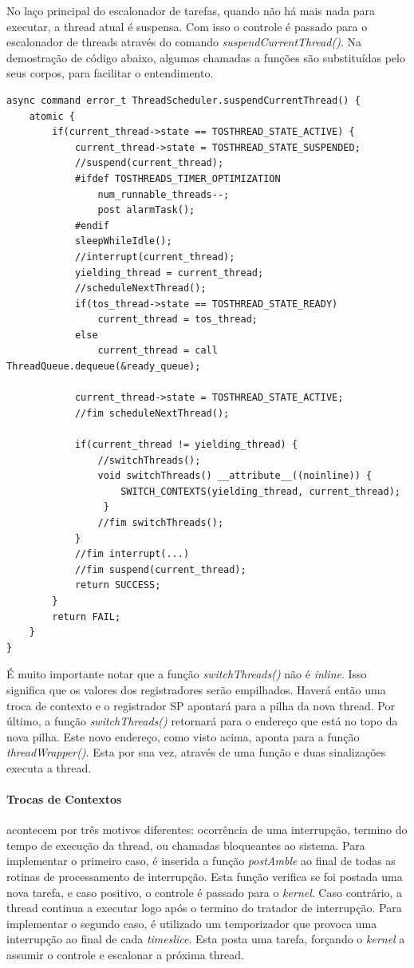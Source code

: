 \documentclass[a4paper, 10pt]{article}
\begin{document}
No laço principal do escalonador de tarefas, quando não há mais nada para executar, a thread atual é suspensa. Com isso
o controle é passado para o escalonador de threads através do comando \textit{suspendCurrentThread()}. Na demostração de
código abaixo, algumas chamadas a funções são substituídas pelo seus corpos, para facilitar o entendimento.
\begin{lstlisting}
async command error_t ThreadScheduler.suspendCurrentThread() {
    atomic {
        if(current_thread->state == TOSTHREAD_STATE_ACTIVE) {
            current_thread->state = TOSTHREAD_STATE_SUSPENDED;
            //suspend(current_thread);
            #ifdef TOSTHREADS_TIMER_OPTIMIZATION
                num_runnable_threads--;
                post alarmTask();
            #endif
            sleepWhileIdle();
            //interrupt(current_thread);
            yielding_thread = current_thread;
            //scheduleNextThread();
            if(tos_thread->state == TOSTHREAD_STATE_READY)
                current_thread = tos_thread;
            else
                current_thread = call ThreadQueue.dequeue(&ready_queue);

            current_thread->state = TOSTHREAD_STATE_ACTIVE;
            //fim scheduleNextThread();

            if(current_thread != yielding_thread) {
                //switchThreads();
                void switchThreads() __attribute__((noinline)) {
                    SWITCH_CONTEXTS(yielding_thread, current_thread);
                 }
                //fim switchThreads();
            }
            //fim interrupt(...)
            //fim suspend(current_thread);
            return SUCCESS;
        }
        return FAIL;
    }
}
\end{lstlisting}
É muito importante notar que a função \textit{switchThreads()} não é \textit{inline}. Isso significa que os valores dos
registradores serão empilhados. Haverá então uma troca de contexto e o registrador SP apontará para a pilha da nova
thread. Por último, a função \textit{switchThreads()} retornará para o endereço que está no topo da nova pilha. Este
novo endereço, como visto acima, aponta para a função \textit{threadWrapper()}. Esta por sua vez, através de uma função
e duas sinalizações executa a thread.

\paragraph{Trocas de Contextos}
acontecem por três motivos diferentes: ocorrência de uma interrupção, termino do tempo de execução da thread, ou chamadas
bloqueantes ao sistema. 
Para implementar o primeiro caso, é inserida a função \textit{postAmble} ao final de todas as rotinas de processamento
de interrupção. Esta função verifica se foi postada uma nova tarefa, e caso positivo, o controle é passado para o
\textit{kernel}. Caso contrário, a thread continua a executar logo após o termino do tratador de interrupção.
Para implementar o segundo caso, é utilizado um temporizador que provoca uma interrupção ao final de cada
\textit{timeslice}. Esta posta uma tarefa, forçando o \textit{kernel} a assumir o controle e escalonar a próxima thread.
\end{document}
